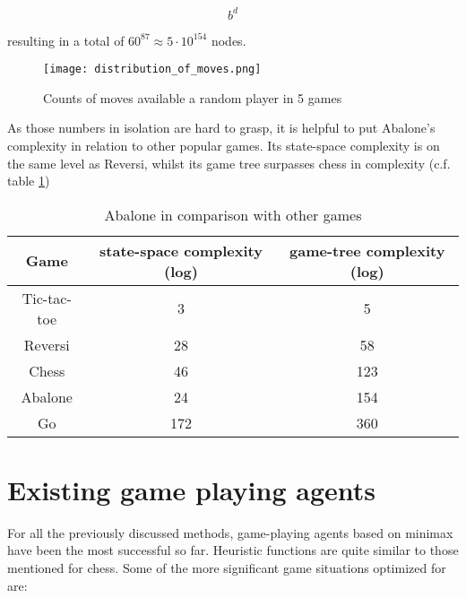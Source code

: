 \begin{equation}
    b^d
\end{equation}

resulting in a total of $60^{87} \approx 5 \cdot 10^{154}$ nodes. \cite{lemmens_constructing_2005}

\begin{figure}
    \centering
    \texttt{[image: distribution\_of\_moves.png]}
    \caption{Counts of moves available a random player in 5 games}
    \label{branching_factor}
\end{figure}

As those numbers in isolation are hard to grasp, it is helpful to put Abalone's complexity in relation to other popular games. Its state-space complexity is on the same level as Reversi, whilst its game tree surpasses chess in complexity (c.f. table \ref{complexity_table})

\begin{table}
    \begin{center}
        \begin{tabular}{  c | c | c  }
            Game        & state-space complexity (log) & game-tree complexity (log) \\
            \hline
            \hline
            Tic-tac-toe & 3                            & 5                          \\
            Reversi     & 28                           & 58                         \\
            Chess       & 46                           & 123                        \\
            Abalone     & 24                           & 154                        \\
            Go          & 172                          & 360                        \\
        \end{tabular}
    \end{center}
    \caption{Abalone in comparison with other games \cite{chorus_implementing_2009}}
    \label{complexity_table}
\end{table}

\section{Existing game playing agents}
\label{existing_game_playing_agents}
For all the previously discussed methods, game-playing agents based on minimax have been the most successful so far. Heuristic functions are quite similar to those mentioned for chess. Some of the more significant game situations optimized for are:

